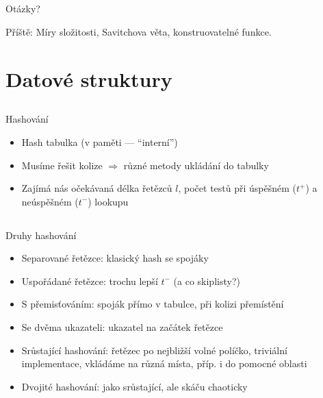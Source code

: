 \documentclass{beamer}
\begin{document}
\subsection{}
\begin{frame}{Otázky?}
\begin{center}
Příště: Míry složitosti, Savitchova věta, konstruovatelné funkce.
\end{center}
\end{frame}

\section{Datové struktury}

\subsection{}
\begin{frame}{Hashování}
\begin{itemize}
\item Hash tabulka (v paměti --- ``interní'')
\item Musíme řešit kolize $\Rightarrow$ různé metody ukládání do tabulky
\item Zajímá nás očekávaná délka řetězců $l$, počet testů při úspěšném ($t^+$) a neúspěšném ($t^-$) lookupu
\end{itemize}
\end{frame}

\subsection{}
\begin{frame}{Druhy hashování}
\begin{itemize}
\item Separované řetězce: klasický hash se spojáky
\item Uspořádané řetězce: trochu lepší $t^-$ (a co skiplisty?)
\item S přemisťováním: spoják přímo v tabulce, při kolizi přemístění
\item Se dvěma ukazateli: ukazatel na začátek řetězce
\item Srůstající hashování: řetězec po nejbližší volné políčko, triviální implementace, vkládáme na různá místa, příp. i do pomocné oblasti
\item Dvojité hashování: jako srůstající, ale skáču chaoticky
\end{itemize}
\end{frame}
\end{document}
